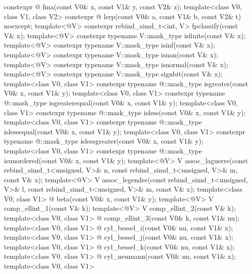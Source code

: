 \begin{codeblock}
{    constexpr @ fma(const V0& x, const V1& y, const V2& z);
  template<class V0, class V1, class V2>
    constexpr @ lerp(const V0& a, const V1& b, const V2& t) noexcept;
  template<@\mathfloatingpoint@ V> constexpr rebind_simd_t<int, V> fpclassify(const V& x);
  template<@\mathfloatingpoint@ V> constexpr typename V::mask_type isfinite(const V& x);
  template<@\mathfloatingpoint@ V> constexpr typename V::mask_type isinf(const V& x);
  template<@\mathfloatingpoint@ V> constexpr typename V::mask_type isnan(const V& x);
  template<@\mathfloatingpoint@ V> constexpr typename V::mask_type isnormal(const V& x);
  template<@\mathfloatingpoint@ V> constexpr typename V::mask_type signbit(const V& x);
  template<class V0, class V1>
    constexpr typename @::mask_type isgreater(const V0& x, const V1& y);
  template<class V0, class V1>
    constexpr typename @::mask_type isgreaterequal(const V0& x, const V1& y);
  template<class V0, class V1>
    constexpr typename @::mask_type isless(const V0& x, const V1& y);
  template<class V0, class V1>
    constexpr typename @::mask_type islessequal(const V0& x, const V1& y);
  template<class V0, class V1>
    constexpr typename @::mask_type islessgreater(const V0& x, const V1& y);
  template<class V0, class V1>
    constexpr typename @::mask_type isunordered(const V0& x, const V1& y);
  template<@\mathfloatingpoint@ V>
    V assoc_laguerre(const rebind_simd_t<unsigned, V>& n, const rebind_simd_t<unsigned, V>& m,
                     const V& x);
  template<@\mathfloatingpoint@ V>
    V assoc_legendre(const rebind_simd_t<unsigned, V>& l, const rebind_simd_t<unsigned, V>& m,
                     const V& x);
  template<class V0, class V1>
    @ beta(const V0& x, const V1& y);
  template<@\mathfloatingpoint@ V> V comp_ellint_1(const V& k);
  template<@\mathfloatingpoint@ V> V comp_ellint_2(const V& k);
  template<class V0, class V1>
    @ comp_ellint_3(const V0& k, const V1& nu);
  template<class V0, class V1>
    @ cyl_bessel_i(const V0& nu, const V1& x);
  template<class V0, class V1>
    @ cyl_bessel_j(const V0& nu, const V1& x);
  template<class V0, class V1>
    @ cyl_bessel_k(const V0& nu, const V1& x);
  template<class V0, class V1>
    @ cyl_neumann(const V0& nu, const V1& x);
  template<class V0, class V1>
}
\end{codeblock}
